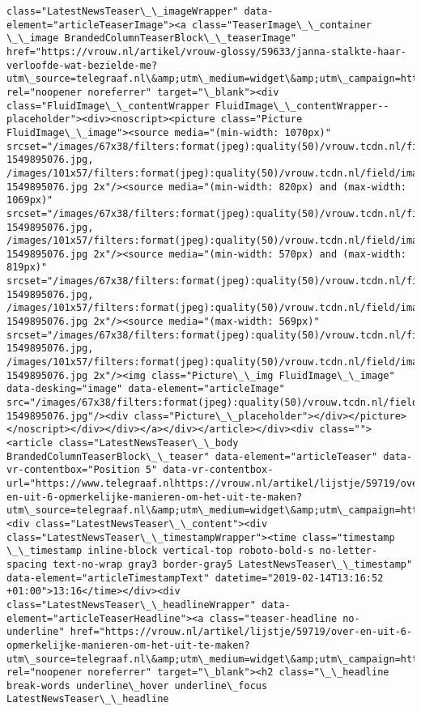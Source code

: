 \documentclass[11pt]{article}
\begin{document}
\begin{Verbatim}[commandchars=\\\{\}]
class="LatestNewsTeaser\_\_imageWrapper" data-element="articleTeaserImage"><a class="TeaserImage\_\_container \_\_image BrandedColumnTeaserBlock\_\_teaserImage" href="https://vrouw.nl/artikel/vrouw-glossy/59633/janna-stalkte-haar-verloofde-wat-bezielde-me?utm\_source=telegraaf.nl\&amp;utm\_medium=widget\&amp;utm\_campaign=https://www.telegraaf.nl/" rel="noopener noreferrer" target="\_blank"><div class="FluidImage\_\_contentWrapper FluidImage\_\_contentWrapper--placeholder"><div><noscript><picture class="Picture FluidImage\_\_image"><source media="(min-width: 1070px)" srcset="/images/67x38/filters:format(jpeg):quality(50)/vrouw.tcdn.nl/field/image/2c7a34ee1619f80b6d641a9600d514b5-1549895076.jpg, /images/101x57/filters:format(jpeg):quality(50)/vrouw.tcdn.nl/field/image/2c7a34ee1619f80b6d641a9600d514b5-1549895076.jpg 2x"/><source media="(min-width: 820px) and (max-width: 1069px)" srcset="/images/67x38/filters:format(jpeg):quality(50)/vrouw.tcdn.nl/field/image/2c7a34ee1619f80b6d641a9600d514b5-1549895076.jpg, /images/101x57/filters:format(jpeg):quality(50)/vrouw.tcdn.nl/field/image/2c7a34ee1619f80b6d641a9600d514b5-1549895076.jpg 2x"/><source media="(min-width: 570px) and (max-width: 819px)" srcset="/images/67x38/filters:format(jpeg):quality(50)/vrouw.tcdn.nl/field/image/2c7a34ee1619f80b6d641a9600d514b5-1549895076.jpg, /images/101x57/filters:format(jpeg):quality(50)/vrouw.tcdn.nl/field/image/2c7a34ee1619f80b6d641a9600d514b5-1549895076.jpg 2x"/><source media="(max-width: 569px)" srcset="/images/67x38/filters:format(jpeg):quality(50)/vrouw.tcdn.nl/field/image/2c7a34ee1619f80b6d641a9600d514b5-1549895076.jpg, /images/101x57/filters:format(jpeg):quality(50)/vrouw.tcdn.nl/field/image/2c7a34ee1619f80b6d641a9600d514b5-1549895076.jpg 2x"/><img class="Picture\_\_img FluidImage\_\_image" data-desking="image" data-element="articleImage" src="/images/67x38/filters:format(jpeg):quality(50)/vrouw.tcdn.nl/field/image/2c7a34ee1619f80b6d641a9600d514b5-1549895076.jpg"/><div class="Picture\_\_placeholder"></div></picture></noscript></div></div></a></div></article></div><div class=""><article class="LatestNewsTeaser\_\_body BrandedColumnTeaserBlock\_\_teaser" data-element="articleTeaser" data-vr-contentbox="Position 5" data-vr-contentbox-url="https://www.telegraaf.nlhttps://vrouw.nl/artikel/lijstje/59719/over-en-uit-6-opmerkelijke-manieren-om-het-uit-te-maken?utm\_source=telegraaf.nl\&amp;utm\_medium=widget\&amp;utm\_campaign=https://www.telegraaf.nl/"><div class="LatestNewsTeaser\_\_content"><div class="LatestNewsTeaser\_\_timestampWrapper"><time class="timestamp \_\_timestamp inline-block vertical-top roboto-bold-s no-letter-spacing text-no-wrap gray3 border-gray5 LatestNewsTeaser\_\_timestamp" data-element="articleTimestampText" datetime="2019-02-14T13:16:52 +01:00">13:16</time></div><div class="LatestNewsTeaser\_\_headlineWrapper" data-element="articleTeaserHeadline"><a class="teaser-headline no-underline" href="https://vrouw.nl/artikel/lijstje/59719/over-en-uit-6-opmerkelijke-manieren-om-het-uit-te-maken?utm\_source=telegraaf.nl\&amp;utm\_medium=widget\&amp;utm\_campaign=https://www.telegraaf.nl/" rel="noopener noreferrer" target="\_blank"><h2 class="\_\_headline break-words underline\_hover underline\_focus LatestNewsTeaser\_\_headline 
\end{Verbatim}
\end{document}
